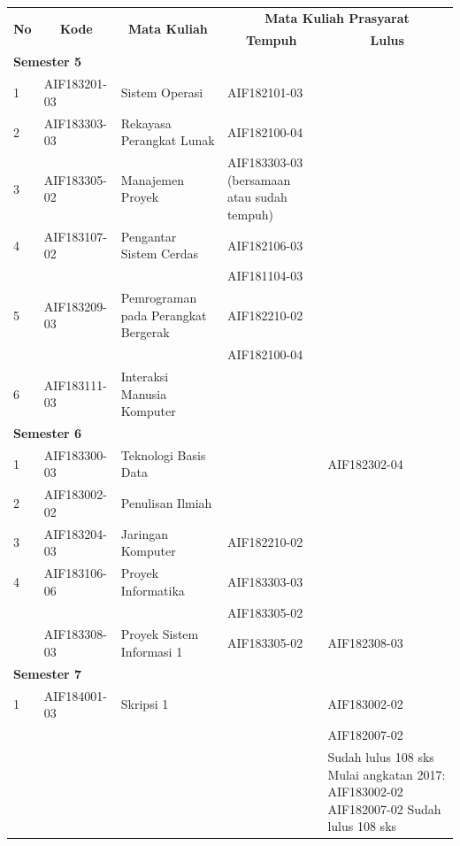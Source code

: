 \begin{table}[H]
	\centering
		\begin{tabular}{|p{0.5cm}|p{2.85cm}|p{4.95cm}|p{2.7cm}|p{2.7cm}|}
			\hline
			\multicolumn{1}{|c|}{\multirow{2}{*}{\textbf{No}}} & \multicolumn{1}{c|}{\multirow{2}{*}{\textbf{Kode}}} & \multicolumn{1}{c|}{\multirow{2}{*}{\textbf{Mata Kuliah}}} & \multicolumn{2}{c|}{\textbf{Mata Kuliah Prasyarat}} \\ \cline{4-5}
			 &  &  & \multicolumn{1}{c|}{\textbf{Tempuh}} & \multicolumn{1}{c|}{\textbf{Lulus}} \\ \hline
			\multicolumn{5}{|l|}{\textbf{Semester 5}} \\ \hline
1 & AIF183201-03 & Sistem Operasi & AIF182101-03 &  \\ \hline
2 & AIF183303-03 & Rekayasa Perangkat Lunak & AIF182100-04 &  \\ \hline
3 & AIF183305-02 & Manajemen Proyek & AIF183303-03 (bersamaan atau sudah tempuh) &  \\ \hline
4 & AIF183107-02 & Pengantar Sistem Cerdas & AIF182106-03 & \\ \hline
  &              &                         & AIF181104-03 & \\ \hline
5 & AIF183209-03 & Pemrograman pada Perangkat Bergerak & AIF182210-02 &  \\ \hline
  &              &                         & AIF182100-04 & \\ \hline
6 & AIF183111-03 & Interaksi Manusia Komputer &  &  \\ \hline
\multicolumn{5}{|l|}{\textbf{Semester 6}} \\ \hline
1 & AIF183300-03 & Teknologi Basis Data &  & AIF182302-04  \\
2 & AIF183002-02 & Penulisan Ilmiah &  &  \\ \hline
3 & AIF183204-03 & Jaringan Komputer & AIF182210-02 &  \\ \hline
4 & AIF183106-06 & Proyek Informatika & AIF183303-03 &  \\ \hline
 & & & AIF183305-02 & \\ \hline 
 & AIF183308-03 & Proyek Sistem Informasi 1 & AIF183305-02 & AIF182308-03 \\ \hline
\multicolumn{5}{|l|}{\textbf{Semester 7}} \\ \hline
1 & AIF184001-03 & Skripsi 1 &  & AIF183002-02 \\ 
 &  &  &  & AIF182007-02 \\ 
 &  &  &  & Sudah lulus 108 sks Mulai angkatan 2017: AIF183002-02 AIF182007-02 Sudah lulus 108 sks \\ \hline

\end{tabular}
\end{table}
